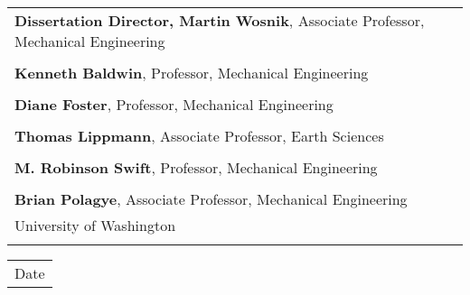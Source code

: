 \documentclass[12pt]{unhthesis}
\begin{document}
\vspace{12mm}
\begin{flushright}

\begin{singlespace}
\tabletail
   {\hline {}\\}
\tablelasttail{}
\begin{supertabular}{p{13cm}}
      \hline
         \textbf{Dissertation Director, Martin Wosnik},
         \small{Associate Professor, Mechanical Engineering} \\
         \vspace{5mm} \\
      \hline
         \textbf{Kenneth Baldwin},
         \small{Professor, Mechanical Engineering}
         \\
         \vspace{5mm}\\
      \hline
         \textbf{Diane Foster},
         \small{Professor, Mechanical Engineering} \\
         \vspace{5mm}\\
      \hline
         \textbf{Thomas Lippmann},
         \small{Associate Professor, Earth Sciences} \\
         \vspace{5mm}\\
      \hline
         \textbf{M. Robinson Swift},
         \small{Professor, Mechanical Engineering} \\
         \vspace{5mm}\\
      \hline
         \textbf{Brian Polagye},
         \small{Associate Professor, Mechanical Engineering} \\
         \small{University of Washington} \\
         \vspace{12mm}\\
    \end{supertabular}

    \begin{tabular*}{2in}{l}
      \hline
        Date
    \end{tabular*}

\vspace{12mm}

\end{singlespace}
\end{flushright}
\end{document}
